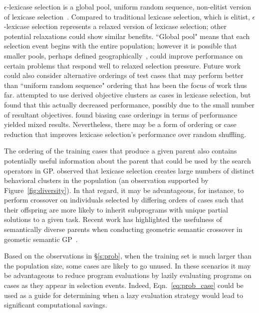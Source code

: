 \documentclass[twoside]{article}
\begin{document}
$\epsilon$-lexicase selection is a global pool, uniform random sequence, non-elitist version of lexicase selection~\citep{spector_assessment_2012}. Compared to traditional lexicase selection, which is elitist, $\epsilon$-lexicase selection represents a relaxed version of lexicase selection; other potential relaxations could show similar benefits. ``Global pool" means that each selection event begins with the entire population; however it is possible that smaller pools, perhaps defined geographically~\citep{spector_trivial_2006}, could improve performance on certain problems that respond well to relaxed selection pressure. Future work could also consider alternative orderings of test cases that may perform better than ``uniform random sequence" ordering that has been the focus of work thus far. \cite{liskowski_comparison_2015} attempted to use derived objective clusters as cases in lexicase selection, but found that this actually decreased performance, possibly due to the small number of resultant objectives. \cite{burks_investigation_2016} found biasing case orderings in terms of performance yielded mixed results. Nevertheless, there may be a form of ordering or case reduction that improves lexicase selection's performance over random shuffling.   
 
The ordering of the training cases that produce a given parent also contains potentially useful information about the parent that could be used by the search operators in GP. \cite{helmuth_general_2015-1} observed that lexicase selection creates large numbers of distinct behavioral clusters in the population (an observation supported by Figure~\ref{fig:diversity}). In that regard, it may be advantageous, for instance, to perform crossover on individuals selected by differing orders of cases such that their offspring are more likely to inherit subprograms with unique partial solutions to a given task. Recent work has highlighted the usefulness of semantically diverse parents when conducting geometric semantic crossover in geometic semantic GP~\citep{chen_geometric_2017}.   

Based on the observations in \S\ref{s:prob}, when the training set is much larger than the population size, some cases are likely to go unused. In these scenarios it may be advantageous to reduce program evaluations by lazily evaluating programs on cases as they appear in selection events. Indeed, Eqn.~\ref{eq:prob_case} could be used as a guide for determining when a lazy evaluation strategy would lead to significant computational savings.
\end{document}

